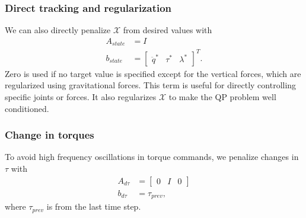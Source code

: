 \documentclass{ws-ijhr}
\newcommand{\tref}[1] {Table \ref{#1}}
\newcommand{\QPx}{\mathcal{X}}
\begin{document}
\subsubsection{Direct tracking and regularization} 
We can also directly penalize $\QPx$ from desired values with
\begin{equation}
  \begin{split}
    A_{state} &= I \\
    b_{state} &= \begin{bmatrix} \ddot{q}^* & \tau^* & \lambda^* \end{bmatrix}^T.
  \end{split}
	\label{eq:id_reg}
\end{equation}
Zero is used if no target value is specified except for the vertical forces, which 
are regularized using gravitational forces. This term is useful for directly 
controlling specific joints or forces. It also regularizes $\QPx$ to make the
QP problem well conditioned.

\subsubsection{Change in torques} 
To avoid high frequency oscillations in torque commands, we penalize changes in 
$\tau$ with
\begin{equation*}
  \begin{split}
    A_{d\tau} &= \begin{bmatrix} 0 & I & 0 \end{bmatrix} \\
    b_{d\tau} &= \tau_{prev},
  \end{split}
\end{equation*} 
where $\tau_{prev}$ is from the last time step.

\end{document}
